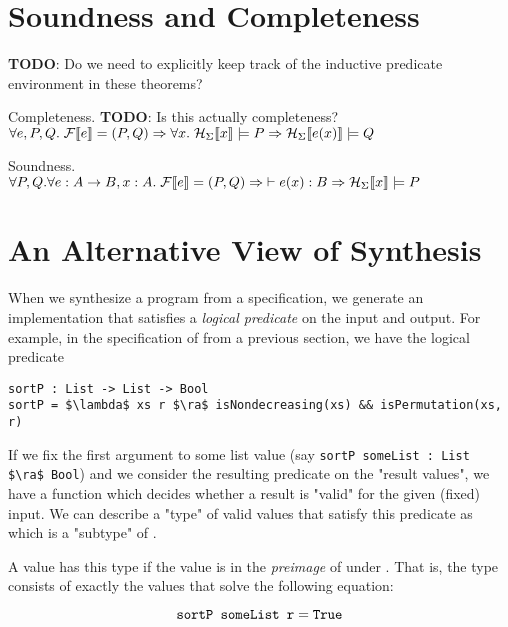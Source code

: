 \documentclass[10pt]{article}
\begin{document}
\section{Soundness and Completeness}

\textbf{TODO}: Do we need to explicitly keep track of the inductive predicate environment in these theorems?

\begin{theorem} Completeness. \textbf{TODO}: Is this actually completeness?\\
  $\forall e, P, Q.\; \mathcal{F}\llbracket e\rrbracket = (P, Q) \Rightarrow \forall x.\; \mathcal{H}_{\Sigma}\llbracket x\rrbracket \models P \Rightarrow \mathcal{H}_{\Sigma}\llbracket e(x)\rrbracket \models Q$
\end{theorem}

\begin{theorem} Soundness.\\
  $\forall P, Q. \forall e : A \rightarrow B, x : A.\; \mathcal{F}\llbracket e\rrbracket = (P, Q) \Rightarrow\; \vdash e(x) : B \Rightarrow \mathcal{H}_{\Sigma}\llbracket x\rrbracket \models P$
\end{theorem}

\section{An Alternative View of Synthesis}

When we synthesize a program from a specification, we generate an implementation that satisfies a \textit{logical predicate} on the
input and output. For example, in the specification of  from a previous section, we have the logical predicate

\begin{lstlisting}
sortP : List -> List -> Bool
sortP = $\lambda$ xs r $\ra$ isNondecreasing(xs) && isPermutation(xs, r)
\end{lstlisting}

If we fix the first argument to some list value (say \lstinline{sortP someList : List $\ra$ Bool}) and we consider the resulting predicate on the "result values", we have
a function which decides whether a result is "valid" for the given (fixed) input. We can describe a "type" of valid values that satisfy this predicate
as  which is a "subtype" of .

A value has this type if the value is in the \textit{preimage} of  under . That is, the type 
consists of exactly the values  that solve the following equation:

\begin{equation*}
  \texttt{sortP someList r} = \texttt{True}
\end{equation*}
\end{document}
